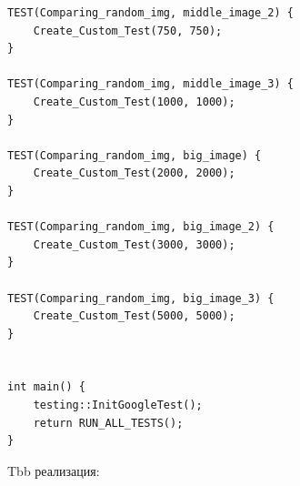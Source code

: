 \documentclass{report}
\begin{document}
\begin{lstlisting}
TEST(Comparing_random_img, middle_image_2) {
    Create_Custom_Test(750, 750);
}

TEST(Comparing_random_img, middle_image_3) {
    Create_Custom_Test(1000, 1000);
}

TEST(Comparing_random_img, big_image) {
    Create_Custom_Test(2000, 2000);
}

TEST(Comparing_random_img, big_image_2) {
    Create_Custom_Test(3000, 3000);
}

TEST(Comparing_random_img, big_image_3) {
    Create_Custom_Test(5000, 5000);
}


int main() {
    testing::InitGoogleTest();
    return RUN_ALL_TESTS();
}

\end{lstlisting}

\par Tbb реализация:
\end{document}
